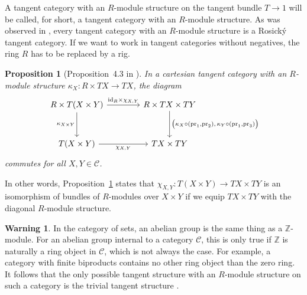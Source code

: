 \documentclass[12pt,reqno, a4paper]{amsart}
\numberwithin{equation}{section}
\theoremstyle{plain}
\newtheorem{Proposition}[Theorem]{Proposition}
\theoremstyle{definition}
\newtheorem{Definition}[Theorem]{Definition}
\newtheorem{Warning}[Theorem]{Warning}
\theoremstyle{remark}
\newcommand{\bbZ}{\mathbb{Z}}
\newcommand{\calC}{\mathcal{C}}
\newcommand{\id}{\mathrm{id}}
\newcommand{\Id}{\mathrm{1}}
\newcommand{\pr}{\mathrm{pr}}
\begin{document}
A tangent category with an $R$-module structure on the tangent bundle $T \to \Id$ will be called, for short, a tangent category with an $R$-module structure. As was observed in \cite[Proposition~4.2]{AintablianBlohmann:2026}, every tangent category with an $R$-module structure is a Rosick\'y tangent category.
If we want to work in tangent categories without negatives, the ring $R$ has to be replaced by a rig.


\begin{Proposition}[Proposition~4.3 in \cite{AintablianBlohmann:2026}]
\label{prop:RCartTan}
In a cartesian tangent category with an $R$-module structure $\kappa_X: R \times TX \to TX$, the diagram
\begin{equation*}
\begin{tikzcd}[column sep=4em, row sep=3em]
R \times T(X \times Y)
\ar[r, "\id_R \times \chi_{X,Y}"]
\ar[d, "\kappa_{X \times Y}"']
&
R \times TX \times TY
\ar[d, "{\big( \kappa_X \circ (\pr_1, \pr_2), \, \kappa_Y \circ (\pr_1, \pr_3) \big)}"]
\\
T(X \times Y) \ar[r, "\chi_{X,Y}"']
&
TX \times TY
\end{tikzcd}
\end{equation*}
commutes for all $X, Y \in \calC$.
\end{Proposition}
In other words, Proposition~\ref{prop:RCartTan} states that $\chi_{X,Y}: T(X \times Y) \to TX \times TY$ is an isomorphism of bundles of $R$-modules over $X \times Y$ if we equip $TX \times TY$ with the diagonal $R$-module structure.

\begin{Warning}
In the category of sets, an abelian group is the same thing as a $\bbZ$-module. For an abelian group internal to a category $\calC$, this is only true if $\bbZ$ is naturally a ring object in $\calC$, which is not always the case. For example, a category with finite biproducts contains no other ring object than the zero ring. It follows that the only possible tangent structure with an $R$-module structure on such a category is the trivial tangent structure \cite[Section~8.10.3]{AintablianBlohmann:2026}.
\end{Warning}
\end{document}
